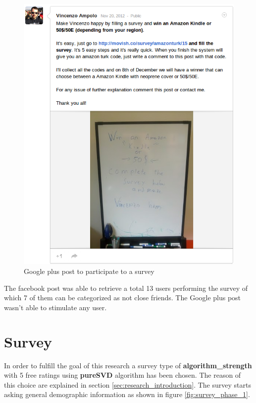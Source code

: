\begin{figure}
  \centering
  \includegraphics[width=\textwidth]{figures/google_plus_survey.png}
  \caption{Google plus post to participate to a survey}
  \label{fig:google_plus_survey}
\end{figure}

The facebook post was able to retrieve a total 13 users performing the survey of which 7 of them can be categorized as not close friends. The Google plus post wasn't able to stimulate any user.

\section{Survey}
\label{sec:research_survey}

In order to fulfill the goal of this research a survey type of \textbf{algorithm\_strength} with 5 free ratings using \textbf{pureSVD} algorithm has been chosen. The reason of this choice are explained in section \ref{sec:research_introduction}. The survey starts asking general demographic information as shown in figure \ref{fig:survey_phase_1}.

